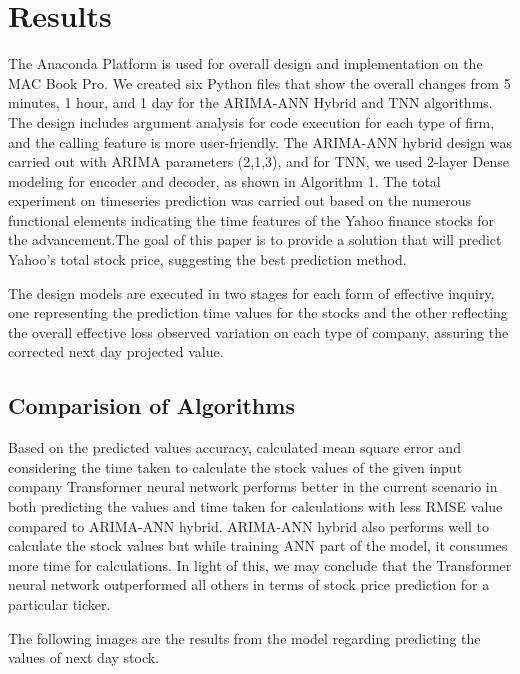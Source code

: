 \chapter{Results}
\label{ch:results}
The Anaconda Platform is used for overall design and implementation on the MAC Book Pro. We created six Python files that show the overall changes from 5 minutes, 1 hour, and 1 day for the ARIMA-ANN Hybrid and TNN algorithms. The design includes argument analysis for code execution for each type of firm, and the calling feature is more user-friendly. The ARIMA-ANN hybrid design was carried out with ARIMA parameters (2,1,3), and for TNN, we used 2-layer Dense modeling for encoder and decoder, as shown in Algorithm 1. The total experiment on timeseries prediction was carried out based on the numerous functional elements indicating the time features of the Yahoo finance stocks for the advancement.The goal of this paper is to provide a solution that will predict Yahoo's total stock price, suggesting the best prediction method.

The design models are executed in two stages for each form of effective inquiry, one representing the prediction time values for the stocks and the other reflecting the overall effective loss observed variation on each type of company, assuring the corrected next day projected value.

\section{Comparision of Algorithms}
Based on the predicted values accuracy,  calculated mean square error and considering the time taken to calculate the stock values of the given input company Transformer neural network performs better in the current scenario in both predicting the values and time taken for calculations with less RMSE value compared to ARIMA-ANN hybrid. ARIMA-ANN hybrid also performs well to calculate the stock values but while training ANN part of the model, it consumes more time for calculations. 
In light of this, we may conclude that the Transformer neural network outperformed all others in terms of stock price prediction for a particular ticker.

The following images are the results from the model regarding predicting the values of next day stock.

